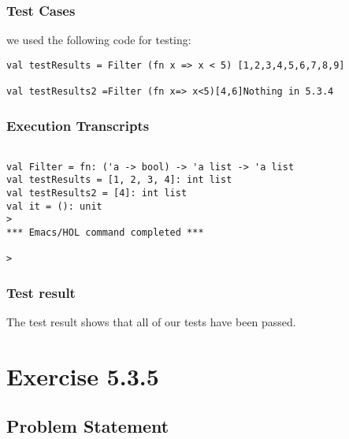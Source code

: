 \documentclass{report}
\begin{document}
\subsection{Test Cases}
\label{sec:test-cases-3}
we used the following code for testing:
\lstset{frameround=tttt}
\begin{lstlisting}[frame=TRBL]
val testResults = Filter (fn x => x < 5) [1,2,3,4,5,6,7,8,9]

val testResults2 =Filter (fn x=> x<5)[4,6]Nothing in 5.3.4
\end{lstlisting}


\subsection{Execution Transcripts}
\label{sec:test-cases-4}
\setcounter{sessioncount}{0}
\begin{session}
  \begin{scriptsize}
\begin{verbatim}

val Filter = fn: ('a -> bool) -> 'a list -> 'a list
val testResults = [1, 2, 3, 4]: int list
val testResults2 = [4]: int list
val it = (): unit
> 
*** Emacs/HOL command completed ***

> 
\end{verbatim}
  \end{scriptsize}
\end{session}
\subsection{Test result}
\label{sec:test-result-2}
The test result shows that all of our tests have been passed.



\chapter{Exercise 5.3.5}
\label{cha:exercise-5.3.5}



\section{Problem Statement}
\label{sec:problem-statement-2}
\end{document}
